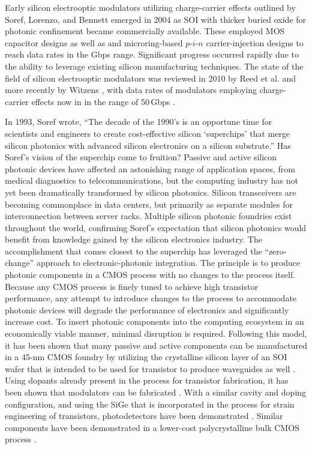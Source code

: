 Early silicon electrooptic modulators utilizing charge-carrier effects outlined by Soref, Lorenzo, and Bennett emerged in 2004 as SOI with thicker buried oxide for photonic confinement became commercially available. These employed MOS capacitor designs \cite{lijo2004,lisa2005} as well as and microring-based \cite{xusc2005,xuma2007} $p$-$i$-$n$ carrier-injection designs to reach data rates in the Gbps range. Significant progress occurred rapidly due to the ability to leverage existing silicon manufacturing techniques. The state of the field of silicon electrooptic modulators was reviewed in 2010 by Reed et al. \cite{rema2010} and more recently by Witzens \cite{wi2018}, with data rates of modulators employing charge-carrier effects now in in the range of 50\,Gbps \cite{pasa2015}. 

In 1993, Soref wrote, ``The decade of the 1990's is an opportune time for scientists and engineers to create cost-effective silicon `superchips' that merge silicon photonics with advanced silicon electronics on a silicon substrate.'' Has Soref's vision of the superchip come to fruition? Passive and active silicon photonic devices have affected an astonishing range of application spaces, from medical diagnostics to telecommunications, but the computing industry has not yet been dramatically transformed by silicon photonics. Silicon transceivers are becoming commonplace in data centers, but primarily as separate modules for interconnection between server racks. Multiple silicon photonic foundries exist throughout the world, confirming Soref's expectation that silicon photonics would benefit from knowledge gained by the silicon electronics industry. The accomplishment that comes closest to the superchip has leveraged the ``zero-change'' approach to electronic-photonic integration. The principle is to produce photonic components in a CMOS process with no changes to the process itself. Because any CMOS process is finely tuned to achieve high transistor performance, any attempt to introduce changes to the process to accommodate photonic devices will degrade the performance of electronics and significantly increase cost. To insert photonic components into the computing ecosystem in an economically viable manner, minimal disruption is required. Following this model, it has been shown that many passive and active components can be manufactured in a 45-nm CMOS foundry by utilizing the crystalline silicon layer of an SOI wafer that is intended to be used for transistor to produce waveguides as well \cite{orma2012}. Using dopants already present in the process for transistor fabrication, it has been shown that modulators can be fabricated \cite{shor2013,alch2016}. With a similar cavity and doping configuration, and using the SiGe that is incorporated in the process for strain engineering of transistors, photodetectors have been demonstrated \cite{alra2016}. Similar components have been demonstrated in a lower-cost polycrystalline bulk CMOS process \cite{shor2013b,meor2014}. 

